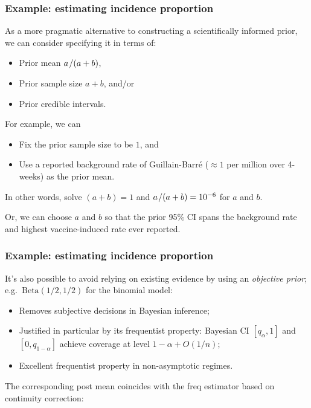 \documentclass[18pt, handout]{beamer}
\newcommand{\defineTightItemizeSpacing}{%
	\setlength{\abovedisplayskip}{.25\baselineskip}%
	\setlength{\belowdisplayskip}{.25\baselineskip}%
}
\newenvironment{tightEquation*}{%
	\defineTightItemizeSpacing%
	\begin{equation*}
}{
	\end{equation*} \ignorespacesafterend
}
\newenvironment{narrowItemize}[1][]{%
  \vspace{-.3\baselineskip}%
  \begin{itemize}[#1]
  \addtolength\itemsep{-.1\baselineskip}
}{
  \end{itemize}
}
\newcommand{\given}{\thinnerspace | \thinnerspace}
\newcommand{\divby}{\thinnerspace /}
\newcommand{\thinnerspace}{\mskip.5\thinmuskip}
\newcommand{\expectation}{\mathbb{E}}
\newcommand{\betaDist}{\mathrm{Beta}}
\begin{document}
\begin{frame}
\frametitle{Example: estimating incidence proportion}

As a more pragmatic alternative to constructing a scientifically informed prior, we can consider specifying it in terms of: 
\vspace*{-.1\baselineskip}
\begin{narrowItemize}
\item Prior mean $a \divby (a + b)$,
\item Prior sample size $a + b$, and/or
\item Prior credible intervals.
\end{narrowItemize}
\vspace*{-.1\baselineskip}

\pause
For example, we can 
\vspace*{-.1\baselineskip}
\begin{narrowItemize}
\item Fix the prior sample size to be $1$, and
\item Use a reported background rate of Guillain-Barré ($\approx 1$ per million over 4-weeks) as the prior mean.
\end{narrowItemize}
\vspace*{-.4\baselineskip}
\pause
In other words, solve $(a + b) = 1$ and $a \divby (a + b) = 10^{-6}$ for $a$ and $b$. %

\pause
Or, we can choose $a$ and $b$ so that the prior 95\% CI spans the background rate and highest vaccine-induced rate ever reported.%

\end{frame}


\begin{frame}
\frametitle{Example: estimating incidence proportion}

It's also possible to avoid relying on existing evidence by using an \textit{objective prior};
e.g.\ $\betaDist(1/2, 1/2)$ for the binomial model:%

\pause%
\begin{narrowItemize}
\item Removes subjective decisions in Bayesian inference; 
\pause
\item Justified in particular by its frequentist property: Bayesian CI $[q_{\alpha}, 1]$ and $[0, q_{1 - \alpha}]$ achieve coverage at level $1 - \alpha + O(1/n)$;
\pause
\item Excellent frequentist property in non-asymptotic regimes.
\end{narrowItemize}

\pause
The corresponding post mean coincides with the freq estimator based on continuity correction:
\end{frame}
\end{document}

